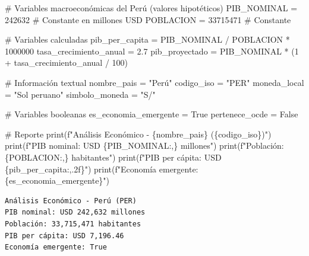 \documentclass[
  doc,
  floatsintext,
  longtable,
  a4paper,
  nolmodern,
  notxfonts,
  notimes,
  12pt,
  colorlinks=true,linkcolor=blue,citecolor=blue,urlcolor=blue]{apa7}
\newenvironment{Shaded}{\begin{snugshade}}{\end{snugshade}}
\newcommand{\BuiltInTok}[1]{\textcolor[rgb]{0.00,0.23,0.31}{#1}}
\newcommand{\CommentTok}[1]{\textcolor[rgb]{0.37,0.37,0.37}{#1}}
\newcommand{\DecValTok}[1]{\textcolor[rgb]{0.68,0.00,0.00}{#1}}
\newcommand{\FloatTok}[1]{\textcolor[rgb]{0.68,0.00,0.00}{#1}}
\newcommand{\NormalTok}[1]{\textcolor[rgb]{0.00,0.23,0.31}{#1}}
\newcommand{\OperatorTok}[1]{\textcolor[rgb]{0.37,0.37,0.37}{#1}}
\newcommand{\SpecialCharTok}[1]{\textcolor[rgb]{0.37,0.37,0.37}{#1}}
\newcommand{\SpecialStringTok}[1]{\textcolor[rgb]{0.13,0.47,0.30}{#1}}
\newcommand{\StringTok}[1]{\textcolor[rgb]{0.13,0.47,0.30}{#1}}
\newcommand{\VariableTok}[1]{\textcolor[rgb]{0.07,0.07,0.07}{#1}}
\begin{document}
\begin{Shaded}
\begin{Highlighting}[]
\CommentTok{\# Variables macroeconómicas del Perú (valores hipotéticos)}
\NormalTok{PIB\_NOMINAL }\OperatorTok{=} \DecValTok{242632}  \CommentTok{\# Constante en millones USD}
\NormalTok{POBLACION }\OperatorTok{=} \DecValTok{33715471}  \CommentTok{\# Constante}

\CommentTok{\# Variables calculadas}
\NormalTok{pib\_per\_capita }\OperatorTok{=}\NormalTok{ PIB\_NOMINAL }\OperatorTok{/}\NormalTok{ POBLACION }\OperatorTok{*} \DecValTok{1000000}
\NormalTok{tasa\_crecimiento\_anual }\OperatorTok{=} \FloatTok{2.7}
\NormalTok{pib\_proyectado }\OperatorTok{=}\NormalTok{ PIB\_NOMINAL }\OperatorTok{*}\NormalTok{ (}\DecValTok{1} \OperatorTok{+}\NormalTok{ tasa\_crecimiento\_anual }\OperatorTok{/} \DecValTok{100}\NormalTok{)}

\CommentTok{\# Información textual}
\NormalTok{nombre\_pais }\OperatorTok{=} \StringTok{"Perú"}
\NormalTok{codigo\_iso }\OperatorTok{=} \StringTok{"PER"}
\NormalTok{moneda\_local }\OperatorTok{=} \StringTok{"Sol peruano"}
\NormalTok{simbolo\_moneda }\OperatorTok{=} \StringTok{"S/"}

\CommentTok{\# Variables booleanas}
\NormalTok{es\_economia\_emergente }\OperatorTok{=} \VariableTok{True}
\NormalTok{pertenece\_ocde }\OperatorTok{=} \VariableTok{False}

\CommentTok{\# Reporte}
\BuiltInTok{print}\NormalTok{(}\SpecialStringTok{f"Análisis Económico {-} }\SpecialCharTok{\{}\NormalTok{nombre\_pais}\SpecialCharTok{\}}\SpecialStringTok{ (}\SpecialCharTok{\{}\NormalTok{codigo\_iso}\SpecialCharTok{\}}\SpecialStringTok{)"}\NormalTok{)}
\BuiltInTok{print}\NormalTok{(}\SpecialStringTok{f"PIB nominal: USD }\SpecialCharTok{\{}\NormalTok{PIB\_NOMINAL}\SpecialCharTok{:,\}}\SpecialStringTok{ millones"}\NormalTok{)}
\BuiltInTok{print}\NormalTok{(}\SpecialStringTok{f"Población: }\SpecialCharTok{\{}\NormalTok{POBLACION}\SpecialCharTok{:,\}}\SpecialStringTok{ habitantes"}\NormalTok{)}
\BuiltInTok{print}\NormalTok{(}\SpecialStringTok{f"PIB per cápita: USD }\SpecialCharTok{\{}\NormalTok{pib\_per\_capita}\SpecialCharTok{:,.2f\}}\SpecialStringTok{"}\NormalTok{)}
\BuiltInTok{print}\NormalTok{(}\SpecialStringTok{f"Economía emergente: }\SpecialCharTok{\{}\NormalTok{es\_economia\_emergente}\SpecialCharTok{\}}\SpecialStringTok{"}\NormalTok{)}
\end{Highlighting}
\end{Shaded}

\begin{verbatim}
Análisis Económico - Perú (PER)
PIB nominal: USD 242,632 millones
Población: 33,715,471 habitantes
PIB per cápita: USD 7,196.46
Economía emergente: True
\end{verbatim}
\end{document}
